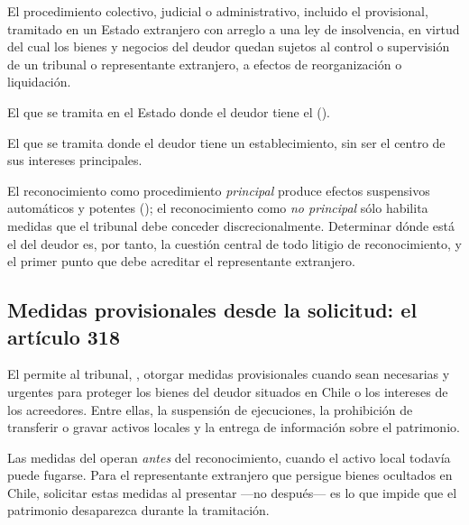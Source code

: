 \begin{description}[leftmargin=0pt,style=nextline,font=\sffamily\bfseries]
  \item[Procedimiento extranjero] El procedimiento colectivo, judicial o administrativo,
  incluido el provisional, tramitado en un Estado extranjero con arreglo a una ley de
  insolvencia, en virtud del cual los bienes y negocios del deudor quedan sujetos al control o
  supervisión de un tribunal o representante extranjero, a efectos de reorganización o
  liquidación.

  \item[Procedimiento extranjero principal] El que se tramita en el Estado donde el deudor
  tiene el  (\comi{}).

  \item[Procedimiento extranjero no principal] El que se tramita donde el deudor tiene un
  establecimiento, sin ser el centro de sus intereses principales.
\end{description}

\begin{foco}
El reconocimiento como procedimiento \emph{principal} produce efectos suspensivos automáticos y
potentes (); el reconocimiento como \emph{no principal} sólo habilita medidas que el
tribunal debe conceder discrecionalmente. Determinar dónde está el \comi{} del deudor es, por
tanto, la cuestión central de todo litigio de reconocimiento, y el primer punto que debe
acreditar el representante extranjero.
\end{foco}

\subsection{Medidas provisionales desde la solicitud: el artículo 318}

El  permite al tribunal, , otorgar medidas provisionales cuando sean necesarias
y urgentes para proteger los bienes del deudor situados en Chile o los intereses de los
acreedores. Entre ellas, la suspensión de ejecuciones, la prohibición de transferir o gravar
activos locales y la entrega de información sobre el patrimonio.

\begin{practica}
Las medidas del  operan \emph{antes} del reconocimiento, cuando el activo local
todavía puede fugarse. Para el representante extranjero que persigue bienes ocultados en
Chile, solicitar estas medidas al presentar ---no después--- es lo que impide que el
patrimonio desaparezca durante la tramitación.
\end{practica}


